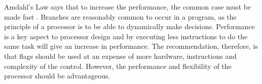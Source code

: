 \documentclass[12pt,a4paper]{article}
\begin{document}
\begin{bibunit}[is-unsrt]
Amdahl's Law says that to increase the performance, the common case must be made fast \cite{amdahl}.
Branches are reasonably common to occur in a program, as the principle of a processor is to be able to dynamically make decisions. 
Performance is a key aspect to processor design and by executing less instructions to do the same task will give an increase in performance.
The recommendation, therefore, is that flags should be used at an expense of more hardware, instructions and complexity of the control.
However, the performance and flexibility of the processor should be advantageous.

\putbib[references]
\end{bibunit}

\begin{bibunit}[is-unsrt]
\renewcommand{\refname}{Bibliography}
\nocite{*}
\putbib[bibliography]
\end{bibunit}
%
%
%
%
\end{document}
